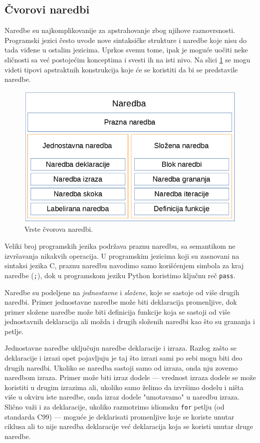 \subsection{Čvorovi naredbi}
\label{subsec:MyASTStatementNodes}

Naredbe su najkomplikovanije za apstrahovanje zbog njihove raznovrsnosti. Programski jezici često uvode nove sintaksičke strukture i naredbe koje nisu do tada viđene u ostalim jezicima. Uprkos svemu tome, ipak je moguće uočiti neke sličnosti sa već postojećim konceptima i svesti ih na isti nivo. Na slici \ref{fig:StatementNodes} se mogu videti tipovi apstraktnih konstrukcija koje će se koristiti da bi se predstavile naredbe.

\begin{figure}[h!]
\centering
\includegraphics[scale=0.5]{images/statement_nodes.png}
\caption{Vrste čvorova naredbi.}
\label{fig:StatementNodes}
\end{figure}

Veliki broj programskih jezika podržava praznu naredbu, sa semantikom ne izvršavanja nikakvih operacija. U programskim jezicima koji su zasnovani na sintaksi jezika C, praznu naredbu navodimo samo korišćenjem simbola za kraj naredbe (\texttt{;}), dok u programskom jeziku Python koristimo ključnu reč \texttt{pass}. 

Naredbe su podeljene na \emph{jednostavne} i \emph{složene}, koje se sastoje od više drugih naredbi. Primer jednostavne naredbe može biti deklaracija promenljive, dok primer složene naredbe može biti definicija funkcije koja se sastoji od više jednostavnih deklaracija ali možda i drugih složenih naredbi kao što su grananja i petlje.

Jednostavne naredbe uključuju naredbe deklaracije i izraza. Razlog zašto se deklaracije i izrazi opet pojavljuju je taj što izrazi sami po sebi mogu biti deo drugih naredbi. Ukoliko se naredba sastoji samo od izraza, onda nju zovemo naredbom izraza. Primer može biti izraz dodele --- vrednost izraza dodele se može koristiti u drugim izrazima ali, ukoliko samo želimo da izvršimo dodelu i ništa više u okviru iste naredbe, onda izraz dodele "umotavamo" u naredbu izraza. Slično važi i za deklaracije, ukoliko razmotrimo idiomsku \texttt{for} petlju (od standarda C99) --- moguće je deklarisati promenljive koje se koriste unutar ciklusa ali to nije naredba deklaracije već deklaracija koja se koristi unutar druge naredbe. 


